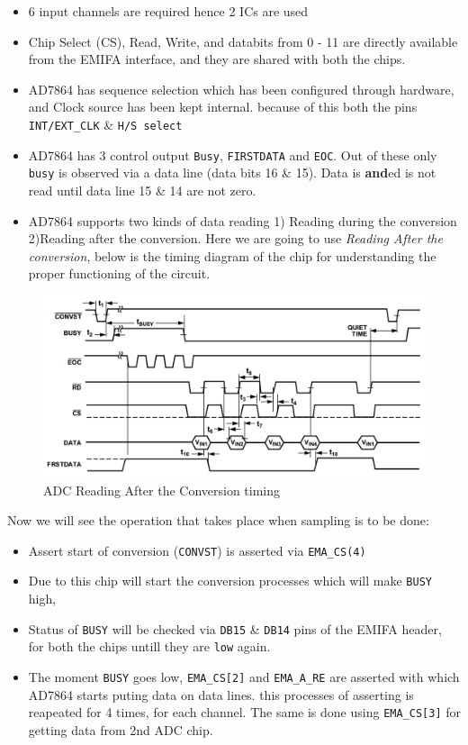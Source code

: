 \begin{itemize}
\item 6 input channels are required hence 2 ICs are used
\item Chip Select (CS), Read, Write, and databits from 0 - 11 are directly available from the EMIFA interface, and they are shared with both the chips.
\item AD7864 has sequence selection which has been configured through hardware, and Clock source has been kept internal. because of this both the pins \texttt{INT/EXT\_CLK} \& \texttt{H/S select}
\item AD7864 has 3 control output \texttt{Busy}, \texttt{FIRSTDATA} and \texttt{EOC}. Out of these only \texttt{busy} is observed via a data line (data bits 16 \& 15). Data is \textbf{and}ed is not read until data line 15 \& 14 are not zero.
\item AD7864 supports two kinds of data reading 1) Reading during the conversion 2)Reading after the conversion. Here we are going to use \textit{Reading After the conversion}, below is the timing diagram of the chip for understanding the proper functioning of the circuit.
\end{itemize}
\begin{figure}[h]
\includegraphics[width = \columnwidth]{fig/adc_time_diag.png}
\caption{ADC Reading After the Conversion timing }
\label{fig:adc_timing}
\end{figure}
Now we will see the operation that takes place when sampling  is to be done:
\begin{itemize}
\item Assert start of conversion (\texttt{CONVST}) is asserted via \texttt{EMA\_CS(4)}
\item Due to this chip will start the conversion processes which will make \texttt{BUSY} high,
\item Status of \texttt{BUSY}  will be checked via \texttt{DB15} \& \texttt{DB14} pins of the EMIFA header, for both the chips untill they are \texttt{low} again.
\item The moment \texttt{BUSY} goes low, \texttt{EMA\_CS[2]} and \texttt{EMA\_A\_RE} are asserted with which AD7864 starts puting data on data lines. this processes of asserting is reapeated for 4 times, for each channel. The same is done using \texttt{EMA\_CS[3]} for getting data from 2nd ADC chip.
\end{itemize}


